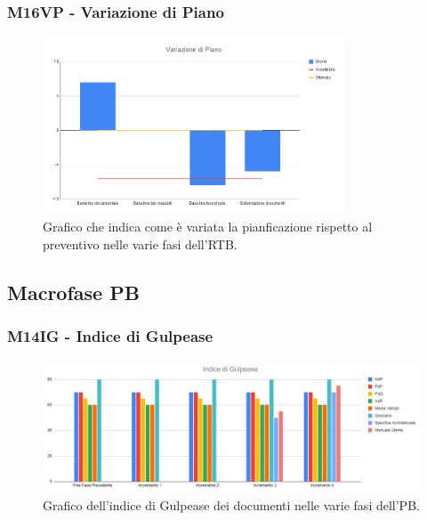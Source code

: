 \subsubsection{M16VP - Variazione di Piano}
\begin{figure}[H]
    \centering\includegraphics[width=0.8\textwidth, height=0.8\textheight,keepaspectratio]{images/RTB-Variazione-di-Piano.png}
    \caption{Grafico che indica come è variata la pianficazione rispetto al preventivo nelle varie fasi dell'RTB.}
\end{figure}  


\subsection{Macrofase PB}
\subsubsection{M14IG - Indice di Gulpease}
\begin{figure}[H]
    \centering\includegraphics[width=\textwidth, height=\textheight,keepaspectratio]{images/PB-Indice-di-Gulpease.png}
    \caption{Grafico dell'indice di Gulpease dei documenti nelle varie fasi dell'PB.}
\end{figure}    

